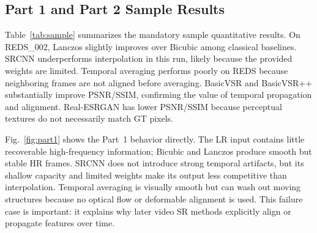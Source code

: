 \documentclass[10pt,twocolumn,letterpaper]{article}
\begin{document}
\subsection{Part 1 and Part 2 Sample Results}
Table~\ref{tab:sample} summarizes the mandatory sample quantitative results. On REDS\_002, Lanczos slightly improves over Bicubic among classical baselines. SRCNN underperforms interpolation in this run, likely because the provided weights are limited. Temporal averaging performs poorly on REDS because neighboring frames are not aligned before averaging. BasicVSR and BasicVSR++ substantially improve PSNR/SSIM, confirming the value of temporal propagation and alignment. Real-ESRGAN has lower PSNR/SSIM because perceptual textures do not necessarily match GT pixels.

Fig.~\ref{fig:part1} shows the Part~1 behavior directly. The LR input contains little recoverable high-frequency information; Bicubic and Lanczos produce smooth but stable HR frames. SRCNN does not introduce strong temporal artifacts, but its shallow capacity and limited weights make its output less competitive than interpolation. Temporal averaging is visually smooth but can wash out moving structures because no optical flow or deformable alignment is used. This failure case is important: it explains why later video SR methods explicitly align or propagate features over time.

\begin{table}[!htbp]
\centering
\small
\caption{Sample-dataset PSNR/SSIM results. Higher is better.}
\label{tab:sample}
\end{table}
\end{document}
